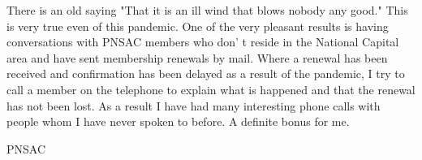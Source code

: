 There is an old saying "That it is an ill wind that blows nobody any good."
This is very true even of this pandemic. One of the very pleasant results is
having conversations with PNSAC members who don' t reside in the National
Capital area and have sent membership renewals by mail. Where a renewal has
been received and confirmation has been delayed as a result of the pandemic, I
try to call a member on the telephone to explain what is happened and that the
renewal has not been lost. As a result I have had many interesting phone calls
with people whom I have never spoken to before. A definite bonus for me.

\begin{footnotesize}
    \raggedleft PNSAC\\
\end{footnotesize}



